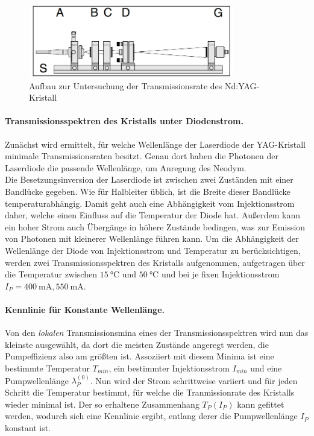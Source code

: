 \documentclass[../main.tex]{subfiles}
\begin{document}
        \begin{figure}[H]
            \centering
            \includegraphics[width=0.8\textwidth]{Bilddateien/Versuchsaufbau/Teil1.jpg}
            \caption{Aufbau zur Untersuchung der Transmissionsrate des Nd:YAG-Kristall \cite[p.28]{doc:experiment08}}
            \label{fig:Aufbau:Teil1}
        \end{figure}    

        \paragraph{Transmissionsspektren des Kristalls unter Diodenstrom.}\label{sec:Transmissionspektren}
        Zunächst wird ermittelt, für welche Wellenlänge der Laserdiode der YAG-Kristall minimale Transmissionsraten besitzt. Genau dort haben die Photonen der Laserdiode die passende Wellenlänge, um Anregung des Neodym.\\
        
        Die Besetzungsinversion der Laserdiode ist zwischen zwei Zuständen mit einer Bandlücke gegeben. Wie für Halbleiter üblich, ist die Breite dieser Bandlücke temperaturabhängig. Damit geht auch eine Abhängigkeit vom Injektionsstrom daher, welche einen Einfluss auf die Temperatur der Diode hat. Außerdem kann ein hoher Strom auch Übergänge in höhere Zustände bedingen, was zur Emission von Photonen mit kleinerer Wellenlänge führen kann. Um die Abhängigkeit der Wellenlänge der Diode von Injektionsstrom und Temperatur zu berücksichtigen, werden zwei Transmissionsspektren des Kristalls aufgenommen, aufgetragen über die Temperatur zwischen $\SI{15}{\celsius}$ und $\SI{50}{\celsius}$ und bei je fixen Injektionsstrom $I_P=\SI{400}{\m\A}, \SI{550}{\m\A}$.

        \paragraph{Kennlinie für Konstante Wellenlänge.} Von den \textit{lokalen} Transmissionsmina eines der Transmissionsspektren wird nun das kleinste ausgewählt, da dort die meisten Zustände angeregt werden, die Pumpeffizienz also am größten ist. Assoziiert mit diesem Minima ist eine bestimmte Temperatur $T_{min}$, ein bestimmter Injektionsstrom $I_{min}$ und eine Pumpwellenlänge $\lambda_P^{(0)}$. Nun wird der Strom schrittweise variiert und für jeden Schritt die Temperatur bestimmt, für welche die Tranmissionrate des Kristalls wieder minimal ist. Der so erhaltene Zusammenhang $T_P(I_P)$ kann gefittet werden, wodurch sich eine Kennlinie ergibt, entlang derer die Pumpwellenlänge $I_P$ konstant ist.\\
        
\end{document}
